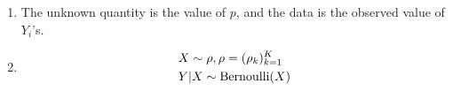 \documentclass{article}
\begin{document}



\begin{enumerate}
  \item The unknown quantity is the value of $p$, and the data is the observed value of $Y_i$'s.
  \item \begin{align*}
  & X \sim \rho, \rho = (\rho_k)_{k=1}^K\\
  & Y | X \sim \operatorname{Bernoulli}(X)
  \end{align*}
\end{enumerate}
\end{document}
